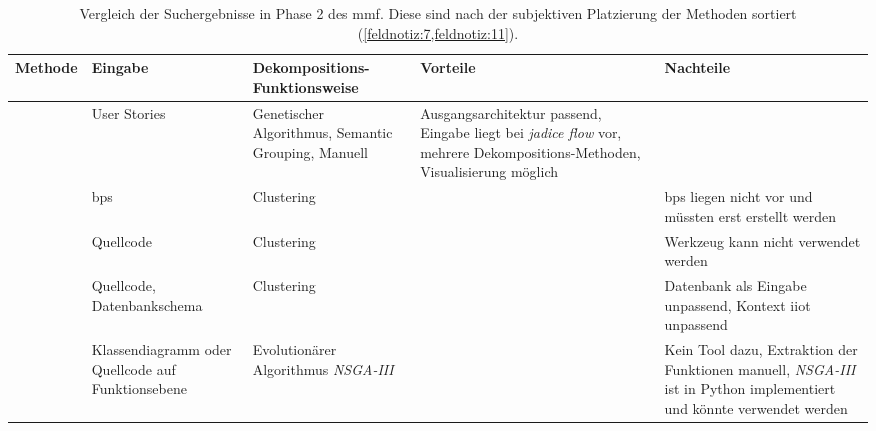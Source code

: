 \begin{table}[!h]
  \centering
  \begin{tabular}{l m{1.9cm} m{3.1cm} m{3.1cm} m{3.1cm}}
    \toprule
    \textbf{Methode}                     & \textbf{Eingabe} & \textbf{Dekompositions-Funktionsweise} & \textbf{Vorteile} & \textbf{Nachteile} \\ \midrule
    \cite{arh-result-no-filter-2}        & User Stories & Genetischer Algorithmus, Semantic Grouping, Manuell & Ausgangsarchitektur passend, Eingabe liegt bei \emph{jadice flow} vor, mehrere Dekompositions-Methoden, Visualisierung möglich &  \\ \hline
    \cite{arh-result-no-filter-3}        & \glspl{bp} & Clustering & & \glspl{bp} liegen nicht vor und müssten erst erstellt werden  \\ \hline
    \cite{arh-result-no-filter-5}        & Quellcode & Clustering & & Werkzeug kann nicht verwendet wer\-den \\ \hline
    \cite{arh-result-important-filter-4} & Quellcode, Daten\-bank\-schema & Clustering & & Datenbank als Ein\-ga\-be unpassend, Kontext \gls{iiot} unpassend \\ \hline
    \cite{arh-result-important-filter-7} & Klassen\-dia\-gramm oder Quell\-code auf Funk\-tions\-ebene & Evolutionärer Algorithmus \emph{NSGA-III} & & Kein Tool dazu, Extraktion der Funktionen manuell, \emph{NSGA-III} ist in Python implementiert und könnte verwendet werden \\ \bottomrule
  \end{tabular}
  \caption[Vergleich der Suchergebnisse in Phase 2 des \gls{mmf}]{
    Vergleich der Suchergebnisse in Phase 2 des \gls{mmf}.
    Diese sind nach der subjektiven Platzierung der Methoden sortiert (\cref{feldnotiz:7,feldnotiz:11}).
  }
  \label{tab:phase2-comparison}
\end{table}